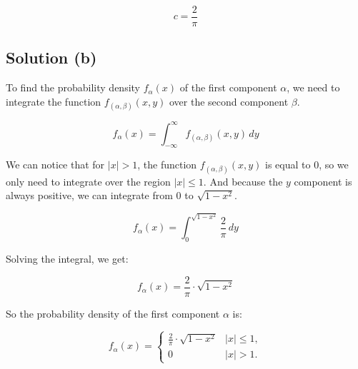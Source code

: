 \begin{equation}
    c = \frac{2}{\pi}
\end{equation}

\subsection*{Solution (b)}

To find the probability density $f_\alpha(x)$ of the first component $\alpha$, we need to integrate the function $f_{(\alpha, \beta)}(x, y)$ over the second component $\beta$.

\begin{equation}
    f_\alpha(x) = \int_{-\infty}^{\infty} f_{(\alpha, \beta)}(x, y) \, dy
\end{equation}

We can notice that for $|x| > 1$, the function $f_{(\alpha, \beta)}(x, y)$
is equal to $0$, so we only need to integrate over the region $|x| \leq 1$.
And because the $y$ component is always positive, we can integrate from $0$ to $\sqrt{1 - x^2}$.

\begin{equation}
    f_\alpha(x) = \int_{0}^{\sqrt{1 - x^2}} \frac{2}{\pi} \, dy
\end{equation}

Solving the integral, we get:

\begin{equation}
    f_\alpha(x) = \frac{2}{\pi} \cdot \sqrt{1 - x^2}
\end{equation}

So the probability density of the first component $\alpha$ is:

\begin{equation}
    f_\alpha(x) =
    \begin{cases}
        \frac{2}{\pi} \cdot \sqrt{1 - x^2} & |x| \leq 1, \\
        0                                  & |x| > 1.
    \end{cases}
\end{equation}
